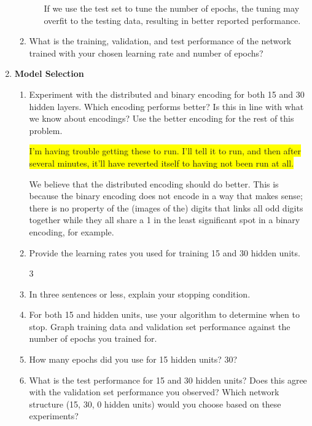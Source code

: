 \documentclass{article}
\newcommand{\edit}[1]{\colorbox{Yellow}{#1}}
\begin{document}
\begin{enumerate}
\begin{enumerate}
\begin{enumerate}
        If we use the test set to tune the number of epochs, the tuning may 
        overfit to the testing data, resulting in better reported performance. 

      \end{enumerate}
    \item What is the training, validation, and test performance of the
      network trained with your chosen learning rate and number of epochs?

    \end{enumerate}

  \item \textbf{Model Selection}
    \begin{enumerate}
    \item Experiment with the distributed and binary encoding for both 15 and
      30 hidden layers. Which encoding performs better? Is this in line with what
      we know about encodings? Use the better encoding for the rest of this problem.

\edit{I'm having trouble getting these to run. I'll tell it to run, and then after
several minutes, it'll have reverted itself to having not been run at all.}

      We believe that the distributed encoding should do better. 
      This is because the binary encoding does not encode in a way
      that makes sense; there is no property of the (images of the)
      digits that links all odd digits together while they all share
      a 1 in the least significant spot in a binary encoding, for 
      example. 


    \item Provide the learning rates you used for training 15 and 30 hidden units.

      \setcounter{enumii}3

    \item In three sentences or less, explain your stopping condition. 

    \item For both 15 and hidden units, use your algorithm to determine when to stop.
      Graph training data and validation set performance against the number of
      epochs you trained for.

    \item How many epochs did you use for 15 hidden units? 30?

    \item What is the test performance for 15 and 30 hidden units? Does this agree
      with the validation set performance you observed? Which network structure
      (15, 30, 0 hidden units) would you choose based on these experiments?


    \end{enumerate}


  \end{enumerate}
\end{document}
